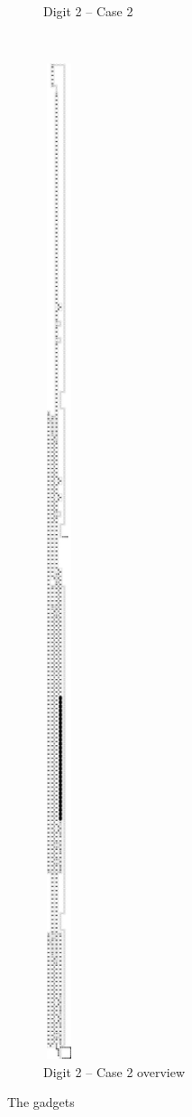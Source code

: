 \begin{itemize}
\begin{figure}[H]
\begin{subfigure}[t]{0.33\textwidth}
                \caption{\label{fig:pre_warp_2_op_msr_msd} Digit 2 -- Case 2}
            \end{subfigure}%
            ~
            \begin{subfigure}[t]{0.2\textwidth}
                \centering
                \includegraphics[width=0.1\textwidth]{overviews/case2/pre_warp_2_op_msr_msd}
                \caption{\label{fig:pre_warp_2_op_msr_msd_overview} Digit 2 -- Case 2 overview}
            \end{subfigure}%
            \caption{\label{fig:pre_warp_gadgets} The {\prewarp} gadgets }
        \end{figure}


\end{itemize}
